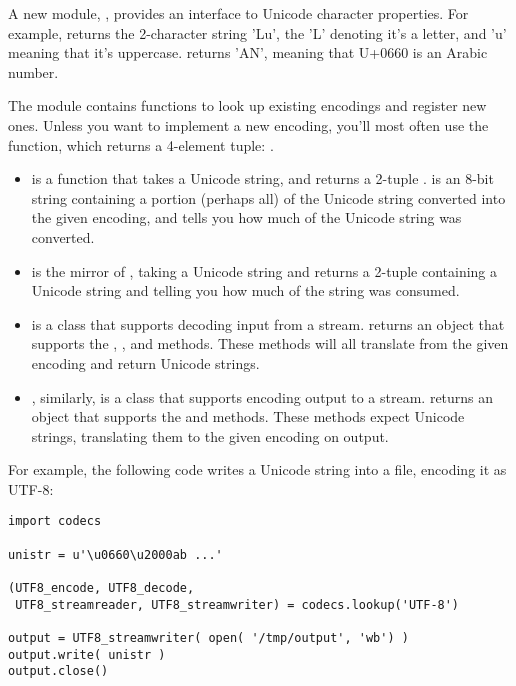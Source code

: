\documentclass{howto}
\begin{document}
A new module, , provides an interface to Unicode
character properties.  For example, 
returns the 2-character string 'Lu', the 'L' denoting it's a letter,
and 'u' meaning that it's uppercase.
 returns 'AN', meaning that U+0660 is
an Arabic number.

The  module contains functions to look up existing encodings
and register new ones.  Unless you want to implement a
new encoding, you'll most often use the
 function, which returns a
4-element tuple: .

\begin{itemize}
\item {} is a function that takes a Unicode string, and
returns a 2-tuple .  
is an 8-bit string containing a portion (perhaps all) of the Unicode
string converted into the given encoding, and  tells you
how much of the Unicode string was converted.

\item {} is the mirror of , 
taking a Unicode string and
returns a 2-tuple  containing a Unicode string
and  telling you how much of the string was consumed.

\item {} is a class that supports decoding input from
a stream.   returns an object that
supports the , , and
 methods.  These methods will all translate from
the given encoding and return Unicode strings.

\item {}, similarly, is a class that supports
encoding output to a stream.  
returns an object that supports the  and
 methods.  These methods expect Unicode strings,
translating them to the given encoding on output.
\end{itemize}

For example, the following code writes a Unicode string into a file, 
encoding it as UTF-8:

\begin{verbatim}
import codecs

unistr = u'\u0660\u2000ab ...'

(UTF8_encode, UTF8_decode,
 UTF8_streamreader, UTF8_streamwriter) = codecs.lookup('UTF-8')

output = UTF8_streamwriter( open( '/tmp/output', 'wb') )
output.write( unistr )
output.close()
\end{verbatim}
\end{document}
